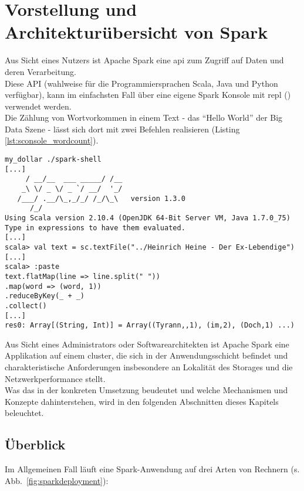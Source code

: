 \chapter{Vorstellung und Architekturübersicht von Spark}
Aus Sicht eines Nutzers ist Apache Spark eine \gls{api} zum Zugriff auf Daten und deren Verarbeitung.\\

Diese API (wahlweise für die Programmiersprachen Scala, Java und Python verfügbar), kann im einfachsten Fall über eine eigene Spark Konsole mit \gls{repl} (\cite{Hail}) verwendet werden.\\
Die Zählung von Wortvorkommen in einem Text - das "`Hello World"' der Big Data Szene - lässt sich dort mit zwei Befehlen realisieren (Listing \ref{lst:sconsole_wordcount}).\\

\begin{lstlisting}[caption={Word Count in der Spark Konsole},label={lst:sconsole_wordcount}]
my_dollar ./spark-shell
[...]
     / __/__  ___ _____/ /__
    _\ \/ _ \/ _ `/ __/  '_/
   /___/ .__/\_,_/_/ /_/\_\   version 1.3.0
      /_/
Using Scala version 2.10.4 (OpenJDK 64-Bit Server VM, Java 1.7.0_75)
Type in expressions to have them evaluated.
[...]
scala> val text = sc.textFile("../Heinrich Heine - Der Ex-Lebendige")
[...]
scala> :paste
text.flatMap(line => line.split(" "))
.map(word => (word, 1))
.reduceByKey(_ + _)
.collect()
[...]
res0: Array[(String, Int)] = Array((Tyrann,,1), (im,2), (Doch,1) ...)
\end{lstlisting}


Aus Sicht eines Administrators oder Softwarearchitekten ist Apache Spark eine Applikation auf einem \gls{cluster}, die sich in der Anwendungsschicht befindet und charakteristische Anforderungen insbesondere an Lokalität des Storages und die Netzwerkperformance stellt.\\

Was das in der konkreten Umsetzung beudeutet und welche Mechanismen und Konzepte dahinterstehen, wird in den folgenden Abschnitten dieses Kapitels beleuchtet.

\section{Überblick}
Im Allgemeinen Fall läuft eine Spark-Anwendung auf drei Arten von Rechnern (s. Abb.~\ref{fig:sparkdeployment}):


